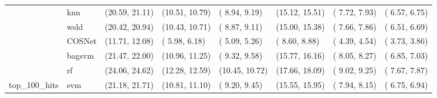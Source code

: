 \begin{table}[H]
{\begin{tabular}{llllllll}
 & knn & (20.59, 21.11) & (10.51, 10.79) & ( 8.94,  9.19) & (15.12, 15.51) & ( 7.72,  7.93) & ( 6.57,  6.75)\\

 & wsld & (20.42, 20.94) & (10.43, 10.71) & ( 8.87,  9.11) & (15.00, 15.38) & ( 7.66,  7.86) & ( 6.51,  6.69)\\

 & COSNet & (11.71, 12.08) & ( 5.98,  6.18) & ( 5.09,  5.26) & ( 8.60,  8.88) & ( 4.39,  4.54) & ( 3.73,  3.86)\\

 & bagsvm & (21.47, 22.00) & (10.96, 11.25) & ( 9.32,  9.58) & (15.77, 16.16) & ( 8.05,  8.27) & ( 6.85,  7.03)\\

 & rf & (24.06, 24.62) & (12.28, 12.59) & (10.45, 10.72) & (17.66, 18.09) & ( 9.02,  9.25) & ( 7.67,  7.87)\\

\multirow{-15}{*}{\raggedright\arraybackslash top\_100\_hits} & svm & (21.18, 21.71) & (10.81, 11.10) & ( 9.20,  9.45) & (15.55, 15.95) & ( 7.94,  8.15) & ( 6.75,  6.94)\\
\bottomrule
\end{tabular}}
\end{table}
